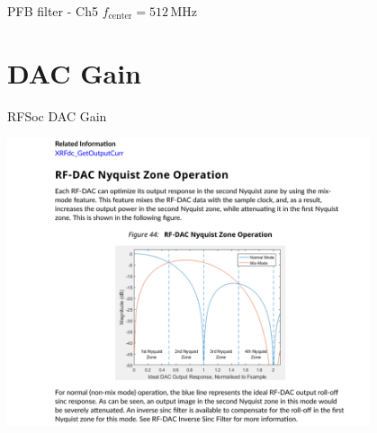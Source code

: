 \documentclass[ignorenonframetext,12pt]{beamer}
\begin{document}
\begin{frame}{PFB filter - Ch5 $f_\text{center}= 512\,\text{MHz}$}
\begin{center}
				\end{center}
\end{frame}

\section{DAC Gain}
\begin{frame}{RFSoc DAC Gain}
				\begin{center}
								\includegraphics[width=0.8\textwidth]{dac_gain}
				\end{center}
\end{frame}
\end{document}
